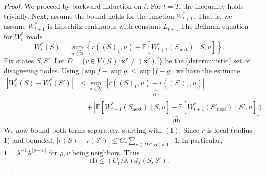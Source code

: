 \documentclass[10pt,a4paper]{amsart}
\begin{document}
\begin{proof}
We proceed by backward induction on $t$. For $t=T$,
 the inequality holds trivially.
Next, assume the bound holds for the function $W_{t+1}^*$. That is, we assume $W_{t+1}^*$ is Lipschitz continuous with constant $L_{t+1}$ 
The Bellman equation for $W_t^*$ reads
\[
W_t^*(S) = \sup_{u \in \mathcal{U}} \left\{ r((S)_1, u) + \mathbb{E}[W_{t+1}^*(S_{\mathrm{next}}) \mid S, u] \right\}.
\]
Fix states $S, S'$. Let $D = \{ v \in V(\mathcal G) : \mathbf{x}^v \neq (\mathbf{x}')^v \}$ be the (deterministic) set of disagreeing nodes. Using $|\sup f - \sup g| \le \sup |f - g|$, we have the estimate
\begin{align*}
    |W_t^*(S) - W_t^*(S')| &\le \sup_{u \in \mathcal{U}} \bigg( \underbrace{|r((S)_1, u) - r((S')_1, u)|}_{\textbf{(I)}} \\
    &\quad + \underbrace{\left| \mathbb{E}[W_{t+1}^*(S_{\mathrm{next}}) \mid S, u] - \mathbb{E}[W_{t+1}^*(S'_{\mathrm{next}}) \mid S', u] \right|}_{\textbf{(II)}} \bigg).
\end{align*}
We now bound both terms separately, starting with $\mathbf{(I)}$. Since $r$ is local (radius 1) and bounded, $|r(S) - r(S')| \le C_r \sum_{v \in D \cap B(\rho, 1)} 1$. In particular, $1 = \lambda^{-1} \lambda^{\Vert \rho - v \Vert}$ for $\rho,v$ being neighbors. Thus 
$$\text{(I)} \le (C_r/\lambda) d_{\lambda}(S, S').$$


\end{proof}
\end{document}
